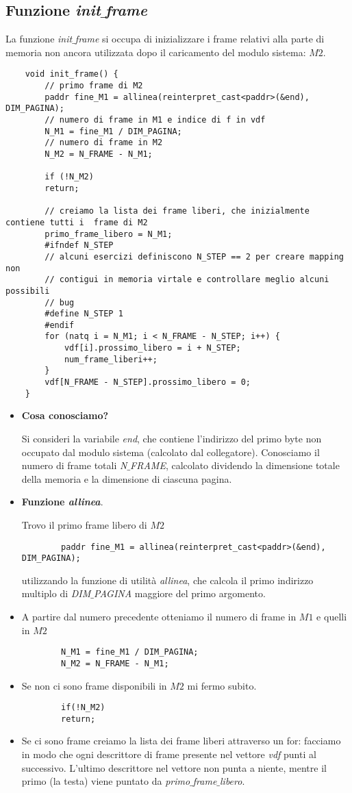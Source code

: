 \subsection{Funzione \emph{init$\_$frame}}
La funzione \emph{init$\_$frame} si occupa di inizializzare i frame relativi alla parte di memoria non ancora utilizzata dopo il caricamento del modulo sistema: $M2$. 
\small 
\begin{verbatim}
	void init_frame() {
		// primo frame di M2
		paddr fine_M1 = allinea(reinterpret_cast<paddr>(&end), DIM_PAGINA);
		// numero di frame in M1 e indice di f in vdf
		N_M1 = fine_M1 / DIM_PAGINA;
		// numero di frame in M2
		N_M2 = N_FRAME - N_M1;
		
		if (!N_M2)
		return;
		
		// creiamo la lista dei frame liberi, che inizialmente contiene tutti i  frame di M2
		primo_frame_libero = N_M1;
		#ifndef N_STEP
		// alcuni esercizi definiscono N_STEP == 2 per creare mapping non
		// contigui in memoria virtale e controllare meglio alcuni possibili
		// bug
		#define N_STEP 1
		#endif
		for (natq i = N_M1; i < N_FRAME - N_STEP; i++) {
			vdf[i].prossimo_libero = i + N_STEP;
			num_frame_liberi++;
		}
		vdf[N_FRAME - N_STEP].prossimo_libero = 0;
	}
\end{verbatim}
\normalsize 
\begin{itemize}
	\item \textbf{Cosa conosciamo?} 
	
	Si consideri la variabile \emph{end}, che contiene l'indirizzo del primo byte non occupato dal modulo sistema (calcolato dal collegatore). Conosciamo il numero di frame totali \emph{N$\_$FRAME}, calcolato dividendo la dimensione totale della memoria e la dimensione di ciascuna pagina.
	\item \textbf{Funzione \emph{allinea}}.
	
	Trovo il primo frame libero di $M2$ 
	\begin{verbatim}
		paddr fine_M1 = allinea(reinterpret_cast<paddr>(&end), DIM_PAGINA);
	\end{verbatim}
	utilizzando la funzione di utilità \emph{allinea}, che calcola il primo indirizzo multiplo di \emph{DIM$\_$PAGINA}  maggiore del primo argomento.
	\item A partire dal numero precedente otteniamo il numero di frame in $M1$ e quelli in $M2$
	\begin{verbatim}
		N_M1 = fine_M1 / DIM_PAGINA;
		N_M2 = N_FRAME - N_M1;
	\end{verbatim}
	\item Se non ci sono frame disponibili in $M2$ mi fermo subito.
	\begin{verbatim}
		if(!N_M2)
		return;
	\end{verbatim}
	\item Se ci sono frame creiamo la lista dei frame liberi attraverso un for: facciamo in modo che ogni descrittore di frame presente nel vettore \emph{vdf} punti al successivo. L'ultimo descrittore nel vettore non punta a niente, mentre il primo (la testa) viene puntato da \emph{primo$\_$frame$\_$libero}.
\end{itemize}

